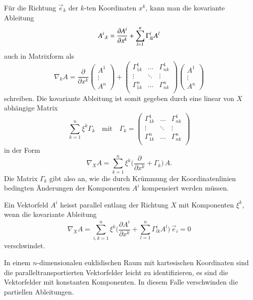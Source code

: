Für die Richtung $\vec{e}_k$ der $k$-ten Koordinaten $x^k$, kann man die
kovariante Ableitung
\[
A^i\mathstrut_{;k}
=
\frac{\partial A^i}{\partial x^k}
+
\sum_{l=1}^n
\Gamma^i_{lk} A^l
\]
auch in Matrixform als
\[
\nabla_k A
=
\frac{\partial}{\partial x^k}
\begin{pmatrix}
A^1\\[-2pt]
\vdots\\
A^n
\end{pmatrix}
+
\begin{pmatrix}
\Gamma_{1k}^1 & \dots  & \Gamma^1_{nk} \\[-2pt]
\vdots        & \ddots & \vdots \\
\Gamma_{1k}^n & \dots  & \Gamma^n_{nk} \\
\end{pmatrix}
\begin{pmatrix}
A^1\\[-2pt]
\vdots\\
A^n
\end{pmatrix}
\]
schreiben.
Die kovariante Ableitung ist somit gegeben durch eine linear von $X$
abhängige Matrix 
\[
\sum_{k=1}^n \xi^k \Gamma_k
\quad
\text{mit}
\quad
\Gamma_k
=
\begin{pmatrix}
\Gamma_{1k}^1 & \dots  & \Gamma^1_{nk} \\[-2pt]
\vdots        & \ddots & \vdots \\
\Gamma_{1k}^n & \dots  & \Gamma^n_{nk} \\
\end{pmatrix}
\]
in der Form
\[
\nabla_X A
=
\sum_{k=1}^n
\xi^k
\biggl(
\frac{\partial}{\partial x^k}
+
\Gamma_k
\biggr)\, A.
\]
Die Matrix $\Gamma_k$ gibt also an, wie die durch Krümmung der
Koordinatenlinien bedingten Änderungen der Komponenten $A^i$ 
kompensiert werden müssen.

\begin{definition}
%
%
Ein Vektorfeld $A^i$ heisst parallel entlang der Richtung
$X$ mit Komponenten $\xi^k$, wenn die kovariante Ableitung
\begin{equation*}
\nabla_X A
=
\sum_{i,k=1}^n
\xi^k
\biggl(
\frac{\partial A^i}{\partial x^k}
+
\sum_{l=1}^n
\Gamma^i_{lk} A^l
\biggr)
\,\vec{e}_i
= 0
\end{equation*}
verschwindet.
\end{definition}

In einem $n$-dimensionalen euklidischen Raum mit kartesischen Koordinaten
sind die paralleltransportierten Vektorfelder leicht zu identifizieren,
es sind die Vektorfelder mit konstanten Komponenten.
In diesem Falle verschwinden die partiellen Ableitungen.

